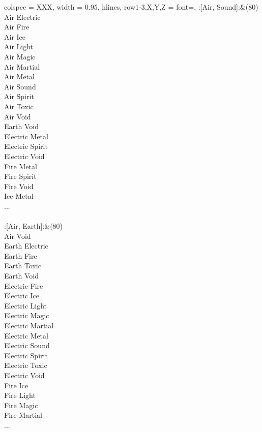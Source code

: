 \begin{longtblr}[
	caption = {2v2 Attacking Effective},
	label = {2v2-Attacking-Effective},
]{
	colspec = {XXX}, width = 0.95\linewidth,
	hlines,
	row{1-3,X,Y,Z} = {font=\bfseries},
}
	:[Air, Sound]:&{(80)\\
	Air Electric \\
	Air Fire \\
	Air Ice \\
	Air Light \\
	Air Magic \\
	Air Martial \\
	Air Metal \\
	Air Sound \\
	Air Spirit \\
	Air Toxic \\
	Air Void \\
	Earth Void \\
	Electric Metal \\
	Electric Spirit \\
	Electric Void \\
	Fire Metal \\
	Fire Spirit \\
	Fire Void \\
	Ice Metal \\
	...\\
	}\\

	:[Air, Earth]:&{(80)\\
	Air Void \\
	Earth Electric \\
	Earth Fire \\
	Earth Toxic \\
	Earth Void \\
	Electric Fire \\
	Electric Ice \\
	Electric Light \\
	Electric Magic \\
	Electric Martial \\
	Electric Metal \\
	Electric Sound \\
	Electric Spirit \\
	Electric Toxic \\
	Electric Void \\
	Fire Ice \\
	Fire Light \\
	Fire Magic \\
	Fire Martial \\
	...\\
	}\\


\end{longtblr}
